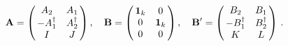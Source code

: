 \begin{equation}
\mathbf{A} = \left( \begin{array}{@{\,}cc@{\,}}
   A_2 & A_1\\
  -A_1^{\dagger}  &  A_2^{\dagger}\\
  I  &  J
  \end{array}  \right),\quad \mathbf{B}=\left( \begin{array}{@{\,}cc@{\,}}
   \textbf{1}_k & 0\\
    0    &  \textbf{1}_k    \\
  0  &  0
  \end{array}  \right),\quad 
\mathbf{B}' = \left( \begin{array}{@{\,}cc@{\,}}
   B_2 & B_1\\
  -B_1^{\dagger}  &  B_2^{\dagger}\\
  K  &  L
  \end{array}  \right)\,.\label{eq:2.17}
\end{equation}

